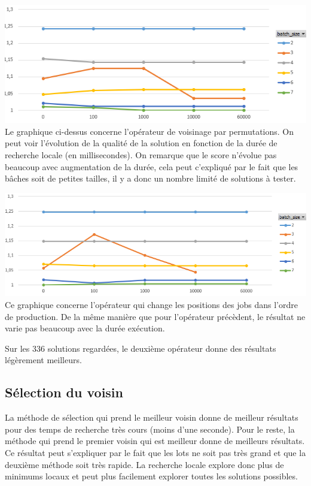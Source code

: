 \includegraphics[width=\textwidth]{parts/mise_en_oeuvre/transposition}
Le graphique ci-dessus concerne l'opérateur de voisinage par permutations.
On peut voir l'évolution de la qualité de la solution en fonction de la durée de recherche locale (en millisecondes).
On remarque que le score n'évolue pas beaucoup avec augmentation de la durée, cela peut c'expliqué par le fait que les bâches soit de petites tailles, il y a donc un nombre limité de solutions à tester.

\includegraphics[width=\textwidth]{parts/mise_en_oeuvre/ordre}
Ce graphique concerne l'opérateur qui change les positions des jobs dans l'ordre de production.
De la même manière que pour l'opérateur précèdent, le résultat ne varie pas beaucoup avec la durée exécution.

Sur les 336 solutions regardées, le deuxième opérateur donne des résultats légèrement meilleurs.

\subsection{Sélection du voisin}

La méthode de sélection qui prend le meilleur voisin donne de meilleur résultats pour des temps de recherche très cours (moins d'une seconde).
Pour le reste, la méthode qui prend le premier voisin qui est meilleur donne de meilleurs résultats.
Ce résultat peut s'expliquer par le fait que les lots ne soit pas très grand et que la deuxième méthode soit très rapide.
La recherche locale explore donc plus de minimums locaux et peut plus facilement explorer toutes les solutions possibles.


